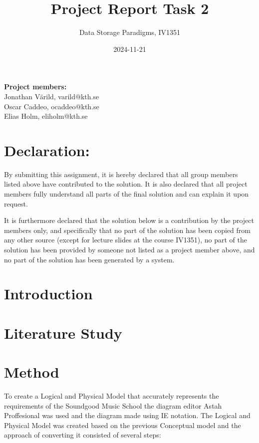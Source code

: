 \documentclass[a4paper]{scrartcl}
\title{Project Report Task 2}
\subtitle{Data Storage Paradigms, IV1351}
\author{}
\date{2024-11-21}
\begin{document}
\maketitle
\noindent\textbf{Project members:} \\ \hfill
Jonathan Värild, varild@kth.se \\ \hfill
Oscar Caddeo, ocaddeo@kth.se \\ \hfill
Elias Holm, eliholm@kth.se \\ \hfill

\section*{Declaration:}

By submitting this assignment, it is hereby declared that all group members listed above have contributed to the solution. It is also declared that all project members fully understand all parts of the final solution and can explain it upon request.

It is furthermore declared that the solution below is a contribution by the project members only, and specifically that no part of the solution has been copied from any other source (except for lecture slides at the course IV1351), no part of the solution has been provided by someone not listed as a project member above, and no part of the solution has been generated by a system.

\section{Introduction}


\section{Literature Study}


\section{Method}

To create a Logical and Physical Model that accurately represents the requirements of the Soundgood Music School the diagram editor Astah Proffesional was used and the diagram made using IE notation. The Logical and Physical Model was created based on the previous Conceptual model and the approach  of converting it consisted of several steps:
\end{document}
